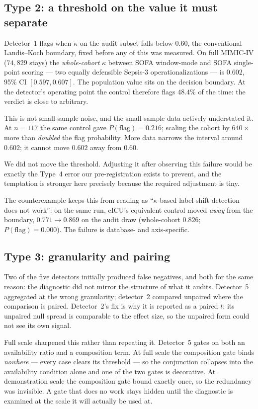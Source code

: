 \documentclass[pmlr,twocolumn,10pt]{jmlr}
\begin{document}
\subsection{Type 2: a threshold on the value it must separate}

Detector~1 flags when $\kappa$ on the audit subset falls below $0.60$, the
conventional Landis--Koch boundary, fixed before any of this was measured. On
full MIMIC-IV ($74{,}829$ stays) the \emph{whole-cohort} $\kappa$ between SOFA
window-mode and SOFA single-point scoring --- two equally defensible Sepsis-3
operationalizations --- is $\mathbf{0.602}$, 95\% CI $[0.597, 0.607]$. The population value sits on the
decision boundary. At the detector's operating point the control therefore flags
$\mathbf{48.4\%}$ of the time: the verdict is close to arbitrary.

This is not small-sample noise, and the small-sample data actively understated
it. At $n=117$ the same control gave $P(\text{flag})=0.216$; scaling the cohort
by $640\times$ more than \emph{doubled} the flag probability. More data narrows
the interval around $0.602$; it cannot move $0.602$ away from $0.60$.

We did not move the threshold. Adjusting it after observing this failure would
be exactly the Type~4 error our pre-registration exists to prevent, and the
temptation is stronger here precisely because the required adjustment is tiny.

The counterexample keeps this from reading as ``$\kappa$-based label-shift
detection does not work'': on the same run, eICU's equivalent control moved
\emph{away} from the boundary, $0.771 \rightarrow 0.869$ on the audit draw
(whole-cohort $0.826$; $P(\text{flag})=0.000$). The failure is database- and
axis-specific.

\subsection{Type 3: granularity and pairing}

Two of the five detectors initially produced false negatives, and both for the
same reason: the diagnostic did not mirror the structure of what it audits.
Detector~5 aggregated at the wrong granularity; detector~2 compared unpaired
where the comparison is paired. Detector~2's fix is why it is reported as a
paired $t$: its unpaired null spread is comparable to the effect size, so the
unpaired form could not see its own signal.

Full scale sharpened this rather than repeating it. Detector~5 gates on both an
availability ratio and a composition term. At full scale the composition gate
binds \emph{nowhere} --- every case clears its threshold --- so the conjunction
collapses into the availability condition alone and one of the two gates is
decorative. At demonstration scale the composition gate bound exactly once, so
the redundancy was invisible. A gate that does no work stays hidden until the
diagnostic is examined at the scale it will actually be used at.
\end{document}
